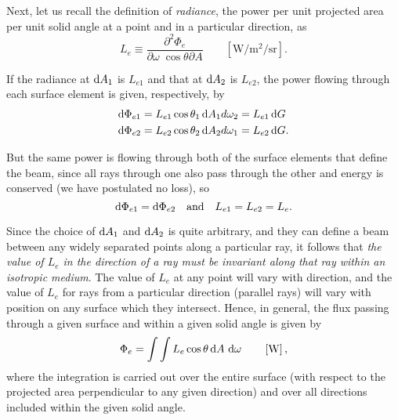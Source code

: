 \begin{refsection}
Next, let us recall the definition of \textsl{radiance}, the power per unit
projected
area per unit solid angle at a point and in a particular direction, as
\begin{equation*}
L_e \equiv \frac{\partial^2 \Phi_e}{\partial\omega\;\cos\theta \partial A}
\qquad \left[\unit{\watt\per\square\meter\per\steradian}\right].
\end{equation*}

If the radiance at $\mathop{}\!\mathrm{d} A_1$ is $L_{e1}$ and that at $\mathop{}\!\mathrm{d} A_2$ is $L_{e2}$, the power
flowing
through each surface element is given, respectively, by
\begin{align}
\mathop{}\!\mathrm{d} \Phi_{e1} &= L_{e1} \cos\theta_1 \mathop{}\!\mathrm{d} A_1 d\omega_2 = L_{e1} \mathop{}\!\mathrm{d} G \nonumber\\
\mathop{}\!\mathrm{d} \Phi_{e2} &= L_{e2} \cos\theta_2 \mathop{}\!\mathrm{d} A_2 d\omega_1 = L_{e2} \mathop{}\!\mathrm{d} G.
\end{align}

But the same power is flowing through both of the surface elements that define
the
beam, since all rays through one also pass through the other and energy is
conserved
(we have postulated no loss), so
\begin{equation}
\mathop{}\!\mathrm{d} \Phi_{e1} = \mathop{}\!\mathrm{d} \Phi_{e2}\quad \textrm{and} \quad L_{e1} = L_{e2} = L_e.
\end{equation}

Since the choice of $\mathop{}\!\mathrm{d} A_1$ and $\mathop{}\!\mathrm{d} A_2$ is quite arbitrary, and they can define a
beam between any widely separated points along a particular ray, it follows that
\emph{the value of $L_e$ in the direction of a ray must be invariant along that
ray within an isotropic medium}.
The value of $L_e$ at any point will vary with direction, and the value of $L_e$
for rays from a particular direction (parallel rays) will vary with position on
any surface which they intersect. Hence, in general, the flux passing through a
given surface and within a given solid
angle is given by
\begin{equation}\label{eqn:nicodemus12}
\Phi_e = \int \int L_e \cos\theta \d A \, \d \omega
\qquad \left[\unit{\watt}\right],
\end{equation}
where the integration is carried out over the entire surface (with respect to
the projected area perpendicular to any given direction) and over all directions
included within the given solid angle.



\end{refsection}
